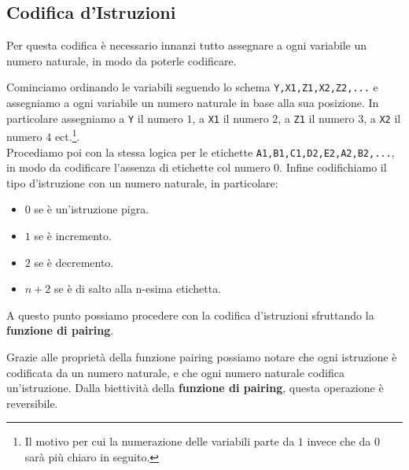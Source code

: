 \subsection{Codifica d'Istruzioni}
Per questa codifica è necessario innanzi tutto assegnare a ogni variabile un numero naturale, in modo da poterle codificare.

Cominciamo ordinando le variabili seguendo lo schema \lstinline{Y,X1,Z1,X2,Z2,...}
e assegniamo a ogni variabile un numero naturale in base alla sua posizione. In particolare assegniamo a \lstinline{Y} il numero \(1\), a \lstinline{X1} il numero \(2\), a \lstinline{Z1} il numero \(3\), a \lstinline{X2} il numero \(4\) ect.\footnote{Il motivo per cui la numerazione delle variabili parte da \(1\) invece che da \(0\) sarà più chiaro in seguito.}.\\
Procediamo poi con la stessa logica per le etichette \lstinline{A1,B1,C1,D2,E2,A2,B2,...},
in modo da codificare l'assenza di etichette col numero \(0\).
Infine codifichiamo il tipo d'istruzione con un numero naturale, in particolare:
\begin{itemize}
  \item \(0\) se è un'istruzione pigra.
  \item \(1\) se è incremento.
  \item \(2\) se è decremento.
  \item \(n+2\) se è di salto alla n-esima etichetta.
\end{itemize}
A questo punto possiamo procedere con la codifica d'istruzioni sfruttando la \textbf{funzione di pairing}.


Grazie alle proprietà della funzione pairing possiamo notare che ogni istruzione è codificata da un numero naturale, e che ogni numero naturale codifica un'istruzione. Dalla biettività della \textbf{funzione di pairing}, questa operazione è reversibile.

